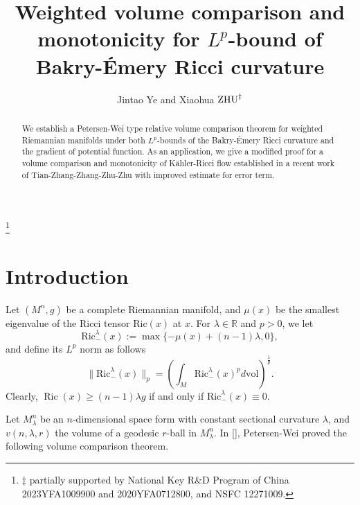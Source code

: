 \documentclass[11pt]{amsart}
\numberwithin{equation}{section}
\begin{document}
	\title[Weighted Volume Comparison and monotonicity ]
	{Weighted  volume comparison and monotonicity for   $L^p$-bound of  Bakry-\'{E}mery Ricci  curvature}
	
	\author{Jintao Ye and Xiaohua  ${\rm ZHU}^\ddag$}
	\address{Department of Mathematics, Peking University, Beijing 100080, P. R. China}

\thanks{$\ddag$  partially supported  by National Key R\&D Program of China
	2023YFA1009900  and 2020YFA0712800,  and NSFC 12271009.}
	
	\begin{abstract}
		We establish a Petersen-Wei type relative volume comparison theorem for weighted
		Riemannian manifolds under both $L^p$-bounds of the Bakry-\'{E}mery Ricci curvature and the gradient of potential function. As an  application, we give a modified proof for a volume comparison and monotonicity of K\"{a}hler-Ricci flow established in a recent work of  Tian-Zhang-Zhang-Zhu-Zhu with improved estimate for error term.
	\end{abstract}
	\maketitle

	
	\section{Introduction}

    Let $(M^n,g)$ be a complete Riemannian manifold, and $\mu(x)$ be the smallest eigenvalue of the Ricci tensor $\mathrm{Ric}(x)$
     at $x$. For $\lambda\in\mathbb{R}$ and $p>0$, we let
    \[
    \mathrm{Ric}^\lambda_-(x):=\max\{-\mu(x)+(n-1)\lambda,0\},
    \]
    and define its $L^p$ norm as follows
    \[
    \|\mathrm{Ric}^\lambda_-(x)\|_p=\left(\int_{M}\mathrm{Ric}^\lambda_-(x)^pd\mathrm{vol}\right)^{\frac{1}{p}}.
    \]
    Clearly, $\operatorname{Ric}(x)\ge (n-1)\lambda g$ if and only if $\mathrm{Ric}^\lambda_-(x)\equiv0$.

    Let $M_\lambda^n$ be an $n$-dimensional space form with constant sectional curvature $\lambda$, and $v(n,\lambda,r)$  the volume of a geodesic  $r$-ball  in $M^n_\lambda$.  In [\cite{PW}], Petersen-Wei proved the following volume comparison theorem.
\end{document}
